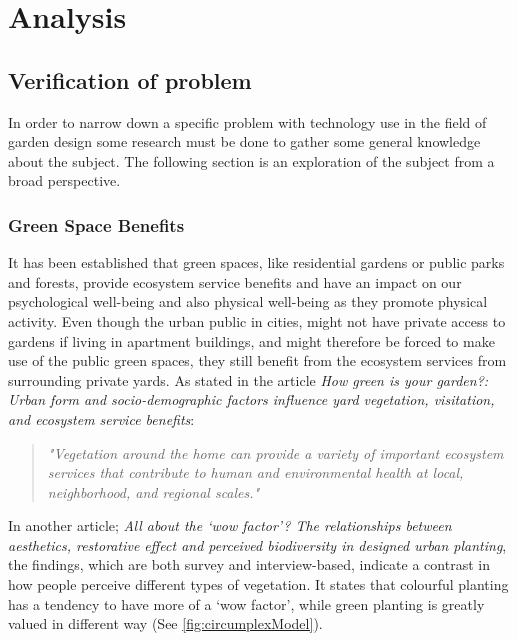  \chapter{Analysis}	
		
	\section{Verification of problem}\label{sec:verification}
	In order to narrow down a specific problem with technology use in the field of garden design some research must be done to gather some general knowledge about the subject. The following section is an exploration of the subject from a broad perspective.
		
 	\subsection{Green Space Benefits}
	It has been established that green spaces, like residential gardens or public parks and forests, provide ecosystem service benefits and have an impact on our psychological well-being and also physical well-being as they promote physical activity\cite{urbanGreenSpace}\cite{healthBenefitsNature}. Even though the urban public in cities, might not have private access to gardens if living in apartment buildings, and might therefore be forced to make use of the public green spaces, they still benefit from the ecosystem services from surrounding private yards\cite{greenSpaceBenefits}. As stated in the article \textit{How green is your garden?: Urban form and socio-demographic factors influence yard vegetation, visitation, and ecosystem service benefits}:\\
	
	\begin{quote}
		\textit{"Vegetation around the home can provide a variety of important ecosystem services that contribute to human and environmental health at local, neighborhood, and regional scales\label{articleQuote}."}\\
	\end{quote}
	
	In another article; \textit{All about the ‘wow factor’? The relationships between aesthetics, restorative effect and perceived biodiversity in designed urban planting}\cite{wowFactor}, the findings, which are both survey and interview-based, indicate a contrast in how people perceive different types of vegetation. It states that colourful planting has a tendency to have more of a ‘wow factor’, while green planting is greatly valued in different way (See \autoref{fig:circumplexModel}).
	
